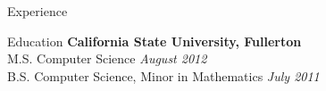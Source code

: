 \documentclass{resume} %
\begin{document}
\begin{rSection}{Experience}


\begin{rSection}{Education}
{\bf California State University, Fullerton}  \\ 
M.S. Computer Science \hfill {\em August 2012}\\
B.S. Computer Science, Minor in Mathematics  \hfill {\em July 2011}\\
\end{rSection}







\end{rSection}
\end{document}
